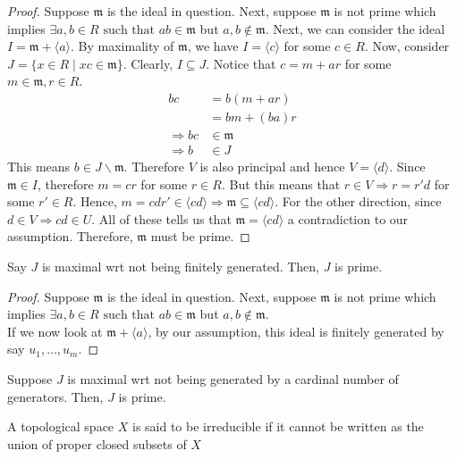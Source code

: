 \documentclass[oneside, 12pt, ]{scrbook}
\newcommand{\m}{\mathfrak{m}}
\theoremstyle{theorem}
\begin{document}
\begin{proof}
Suppose $\m$ is the ideal in question. Next, suppose $\m$ is not prime which implies  $\exists a,b \in R \text{ such that } ab \in \m$ but $a,b \not \in \m$. Next, we can consider the ideal $I = \m + \langle a \rangle$. By maximality of $\m$, we have $I = \langle c \rangle$ for some $c\in R$. Now, consider $J = \{x \in R \mid xc \in \m\}$. Clearly, $I \subseteq J$. Notice that $c = m + ar$ for some $m \in \m , r \in R$. 
\begin{align*}
bc &= b(m+ar) \\
&= bm + (ba)r \\
\Rightarrow bc &\in \m \\
\Rightarrow b &\in J 
\end{align*} 
This means $b \in J \backslash \m$. Therefore $V$ is also principal and hence $V = \langle d \rangle$. Since $\m \in I$, therefore $m = cr$ for some $r\in R$. But this means that $r\in V \Rightarrow r = r'd$ for some $r' \in R$. Hence, $m = cd r' \in \langle cd \rangle \Rightarrow \m \subseteq \langle cd \rangle$. For the other direction, since $d\in V \Rightarrow cd \in U$. All of these tells us that $\m = \langle cd \rangle$ a contradiction to our assumption. Therefore, $\m$ must be prime. 
\end{proof}


\begin{proposition}
Say $J$ is maximal wrt not being finitely generated. Then, $J$ is prime.
\end{proposition}

\begin{proof}
Suppose $\m$ is the ideal in question. Next, suppose $\m$ is not prime which implies  $\exists a,b \in R \text{ such that } ab \in \m$ but $a,b \not \in \m$. \\

If we now look at $\m + \langle a \rangle$, by our assumption, this ideal is finitely generated by say $u_{1}, \hdots , u_{m}$. 
\end{proof}

\begin{exercise}
Suppose $J$ is maximal wrt not being generated by a cardinal number of generators. Then, $J$ is prime.
\end{exercise}

\begin{definition}
A topological space $X$ is said to be irreducible if it cannot be written as the union of proper closed subsets of $X$
\end{definition}
\end{document}
